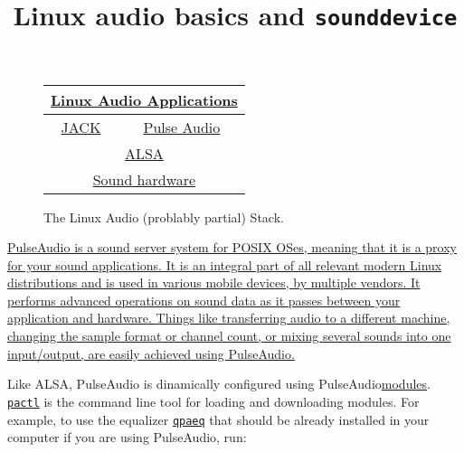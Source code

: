 \title{Linux audio basics and \texttt{sounddevice}}

\maketitle

\begin{figure}
  \begin{center}
    \begin{tabular}{|c|c|}
      \hline
      \multicolumn{2}{c}{\href{https://en.wikipedia.org/wiki/List\_of\_Linux\_audio\_software}{Linux Audio Applications}} \\
      \hline
      \href{https://jackaudio.org/}{JACK} & \href{https://www.freedesktop.org/wiki/Software/PulseAudio/}{Pulse Audio} \\
      \hline
      \multicolumn{2}{c}{\href{https://www.alsa-project.org}{ALSA}} \\
      \hline
      \multicolumn{2}{c}{\href{https://www.alsa-project.org/wiki/Matrix:Main}{Sound hardware}} \\
      \hline
    \end{tabular}
  \end{center}
  \caption{The Linux Audio (problably partial) Stack.}
  \label{fig:stack}
\end{figure}

\href{https://www.freedesktop.org/wiki/Software/PulseAudio/}{PulseAudio
  is a sound server system for POSIX OSes, meaning that it is a proxy
  for your sound applications. It is an integral part of all relevant
  modern Linux distributions and is used in various mobile devices, by
  multiple vendors. It performs advanced operations on sound data as
  it passes between your application and hardware. Things like
  transferring audio to a different machine, changing the sample
  format or channel count, or mixing several sounds into one
  input/output, are easily achieved using
  PulseAudio.}~\cite{newmarch2017pulseaudio}

Like ALSA, PulseAudio is dinamically configured using
PulseAudio\href{https://www.freedesktop.org/wiki/Software/PulseAudio/Documentation/User/Modules/}{modules}. \texttt{\href{https://linux.die.net/man/1/pactl}{pactl}}
is the command line tool for loading and downloading modules. For
example, to use the equalizer
\texttt{\href{https://www.freedesktop.org/wiki/Software/PulseAudio/Documentation/User/Equalizer/}{qpaeq}}
that should be already installed in your computer if you are using
PulseAudio, run:

